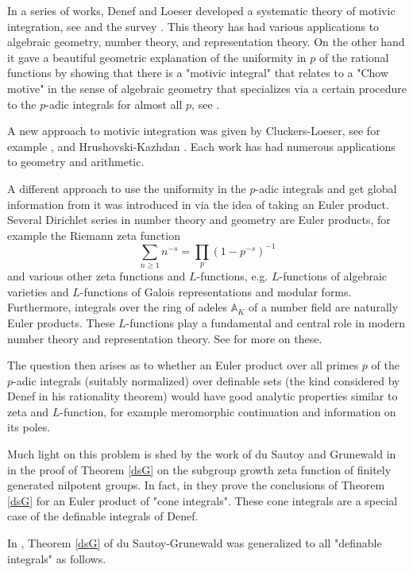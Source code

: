 \documentclass[12pt]{amsart}
\def\A{\mathbb{A}}
\numberwithin{equation}{section}
\begin{document}
In a series of works, Denef and Loeser developed a systematic theory of motivic integration, see \cite{DL} and the survey 
\cite{francois-surv}. This theory has had various applications to algebraic geometry, number theory, and representation theory. On the other hand it gave a beautiful geometric explanation of the uniformity in $p$ of the rational functions by showing that there is a "motivic integral" that relates to a "Chow motive" in the sense of algebraic geometry that specializes via a certain procedure to the $p$-adic integrals for almost all $p$, see \cite{DL}. 

A new approach to motivic integration was given by Cluckers-Loeser, see for example \cite{CL2}, and Hrushovski-Kazhdan \cite{HK}. Each work has had numerous applications to geometry and arithmetic.

A different approach to use the uniformity in the $p$-adic integrals and get global information from it was introduced in \cite{zeta1} via the idea of taking an Euler product. Several Dirichlet series in number theory and geometry are Euler products, for example the Riemann zeta function
$$\sum_{n\geq 1} n^{-s}=\prod_p (1-p^{-s})^{-1}$$
and various other zeta functions and $L$-functions, e.g. $L$-functions of algebraic varieties and $L$-functions of Galois representations and modular forms. Furthermore, integrals over the ring of adeles $\A_K$ of a number field 
are naturally Euler products. These $L$-functions play a fundamental and central role in modern number theory and representation theory. See \cite{adeles-surv} for more on these.

The question then arises as to whether an Euler product over all primes $p$ of the $p$-adic integrals (suitably normalized)
over definable sets (the kind considered by Denef in his rationality theorem) would have good analytic properties similar to zeta and $L$-function, for example meromorphic continuation and information on its poles. 

Much light on this problem is shed by the work of du Sautoy and Grunewald in \cite{dsG} in the proof of Theorem 
\ref{dsG} on the subgroup growth zeta function of finitely generated nilpotent groups. In fact, in \cite{dsG} they prove 
the conclusions of Theorem \ref{dsG} for an Euler product of "cone integrals". These cone integrals are a special case of the definable integrals of Denef. 

In \cite{zeta1}, Theorem \ref{dsG} of du Sautoy-Grunewald was generalized to all "definable integrals" as follows.
\end{document}
